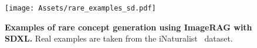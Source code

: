 \begin{figure}[htp]
  \centering
   \texttt{[image: Assets/rare\_examples\_sd.pdf]}
   \caption{\textbf{Examples of rare concept generation using ImageRAG with SDXL.}
   Real examples are taken from the iNaturalist~\cite{van2018inaturalist} dataset.
 }  

   \label{fig:rare_sd}
\end{figure}